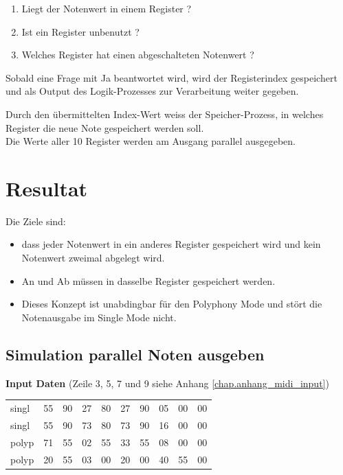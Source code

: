 \begin{enumerate}
	\item Liegt der Notenwert in einem Register ? 
	\item Ist ein Register unbenutzt ?
	\item Welches Register hat einen abgeschalteten Notenwert ?
\end{enumerate}

Sobald eine Frage mit Ja beantwortet wird, wird der Registerindex gespeichert und als Output des Logik-Prozesses zur Verarbeitung weiter gegeben.

Durch den übermittelten Index-Wert weiss der Speicher-Prozess, in welches Register die neue Note gespeichert werden soll.\\
Die Werte aller 10 Register werden am Ausgang parallel ausgegeben.

\section{Resultat}\label{test_polypohnie}

Die Ziele sind:

\begin{itemize}
    \item dass jeder Notenwert in ein anderes Register gespeichert wird und kein Notenwert zweimal abgelegt wird.
    \item An und Ab müssen in dasselbe Register gespeichert werden.
    \item Dieses Konzept ist unabdingbar für den Polyphony Mode und stört die Notenausgabe im Single Mode nicht. 
\end{itemize}


\subsection{Simulation parallel Noten ausgeben}

\textbf{Input Daten} (Zeile 3, 5, 7 und 9 siehe Anhang \ref{chap.anhang_midi_input})

{
\renewcommand{\arraystretch}{1.0}
\begin{tabular*}{\textwidth}{@{}@{\extracolsep{\fill}}*{10}{l}@{}}
singl & 55 & 90 & 27 & 80 & 27 & 90 & 05 & 00 & 00\\
singl & 55 & 90 & 73 & 80 & 73 & 90 & 16 & 00 & 00\\
polyp & 71 & 55 & 02 & 55 & 33 & 55 & 08 & 00 & 00\\
polyp & 20 & 55 & 03 & 00 & 20 & 00 & 40 & 55 & 00
\end{tabular*}
}

